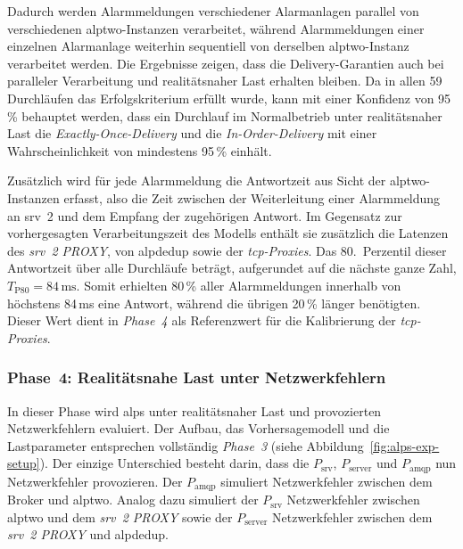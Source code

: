 \newpage

Dadurch werden Alarmmeldungen verschiedener Alarmanlagen parallel von verschiedenen \gls{alptwo}-Instanzen verarbeitet, während Alarmmeldungen einer einzelnen Alarmanlage weiterhin sequentiell von derselben \gls{alptwo}-Instanz verarbeitet werden. Die Ergebnisse zeigen, dass die Delivery-Garantien auch bei paralleler Verarbeitung und realitätsnaher Last erhalten bleiben. Da in allen 59 Durchläufen das Erfolgskriterium erfüllt wurde, kann mit einer Konfidenz von 95\,\% behauptet werden, dass ein Durchlauf im Normalbetrieb unter realitätsnaher Last die \textit{Exactly-Once-Delivery} und die \textit{In-Order-Delivery} mit einer Wahrscheinlichkeit von mindestens 95\,\% einhält.

Zusätzlich wird für jede Alarmmeldung die Antwortzeit aus Sicht der \gls{alptwo}-Instanzen erfasst, also die Zeit zwischen der Weiterleitung einer Alarmmeldung an \gls{srv}~2 und dem Empfang der zugehörigen Antwort. Im Gegensatz zur vorhergesagten Verarbeitungszeit des Modells enthält sie zusätzlich die Latenzen des \textit{\gls{srv}~2 PROXY}, von \gls{alpdedup} sowie der \textit{\gls{tcp}-Proxies}. Das 80.~Perzentil dieser Antwortzeit über alle Durchläufe beträgt, aufgerundet auf die nächste ganze Zahl, $T_{\text{P80}} = 84\,\text{ms}$. Somit erhielten 80\,\% aller Alarmmeldungen innerhalb von höchstens 84\,ms eine Antwort, während die übrigen 20\,\% länger benötigten. Dieser Wert dient in \textit{Phase~4} als Referenzwert für die Kalibrierung der \textit{\gls{tcp}-Proxies}.

\subsubsection{Phase~4: Realitätsnahe Last unter Netzwerkfehlern}
\label{sub-sub:exp-alps-phase-4}

In dieser Phase wird \gls{alps} unter realitätsnaher Last und provozierten Netzwerkfehlern evaluiert. Der Aufbau, das Vorhersagemodell und die Lastparameter entsprechen vollständig \textit{Phase~3} (siehe Abbildung~\ref{fig:alps-exp-setup}). Der einzige Unterschied besteht darin, dass die $P_{\text{srv}}$, $P_{\text{server}}$ und $P_{\text{amqp}}$ nun Netzwerkfehler provozieren. Der $P_{\text{amqp}}$ simuliert Netzwerkfehler zwischen dem Broker und \gls{alptwo}. Analog dazu simuliert der $P_{\text{srv}}$ Netzwerkfehler zwischen \gls{alptwo} und dem \textit{\gls{srv}~2 PROXY} sowie der $P_{\text{server}}$ Netzwerkfehler zwischen dem \textit{\gls{srv}~2 PROXY} und \gls{alpdedup}.


